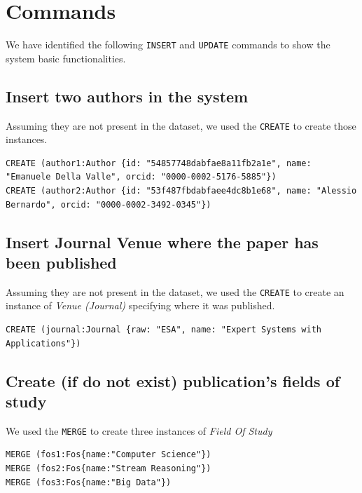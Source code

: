 \documentclass{Configuration_Files/PoliMi3i_thesis}
\begin{document}
\section{Commands}
We have identified the following \verb |INSERT| and \verb |UPDATE| commands to show the system basic functionalities.

\subsection{Insert two authors in the system}
Assuming they are not present in the dataset, we used the \verb |CREATE| to create those instances.
\begin{lstlisting}[language=cypher, label=lst:cypher-example]
CREATE (author1:Author {id: "54857748dabfae8a11fb2a1e", name: "Emanuele Della Valle", orcid: "0000-0002-5176-5885"})
CREATE (author2:Author {id: "53f487fbdabfaee4dc8b1e68", name: "Alessio Bernardo", orcid: "0000-0002-3492-0345"})
\end{lstlisting}

\subsection{Insert Journal Venue where the paper has been published}
Assuming they are not present in the dataset, we used the \verb |CREATE| to create an instance of \emph{Venue (Journal)}
specifying where it was published.
\begin{lstlisting}[language=cypher, label=lst:cypher-example]
CREATE (journal:Journal {raw: "ESA", name: "Expert Systems with Applications"})
\end{lstlisting}

\subsection{Create (if do not exist) publication's fields of study}
We used the \verb |MERGE| to create three instances of \emph{Field Of Study}
\begin{lstlisting}[language=cypher, label=lst:cypher-example]
MERGE (fos1:Fos{name:"Computer Science"})
MERGE (fos2:Fos{name:"Stream Reasoning"})
MERGE (fos3:Fos{name:"Big Data"})
\end{lstlisting}
\end{document}
